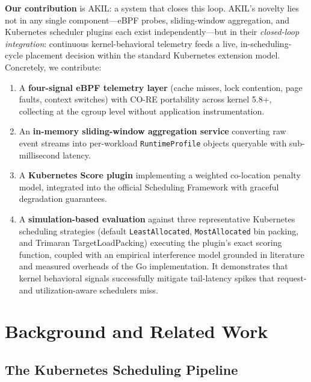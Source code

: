\documentclass[10pt,conference,a4paper]{IEEEtran}
\newcommand{\akil}{\textsc{AKIL}\xspace}
\newcommand{\sys}{\akil}
\begin{document}
\textbf{Our contribution} is \sys: a system that closes this loop.
AKIL's novelty lies not in any single component---eBPF probes, sliding-window
aggregation, and Kubernetes scheduler plugins each exist independently---but in their
\emph{closed-loop integration}: continuous kernel-behavioral telemetry feeds a live,
in-scheduling-cycle placement decision within the standard Kubernetes extension model.
Concretely, we contribute:

\begin{enumerate}[leftmargin=*,topsep=2pt,itemsep=1pt]
  \item A \textbf{four-signal eBPF telemetry layer} (cache misses, lock contention,
        page faults, context switches) with CO-RE portability across kernel 5.8+,
        collecting at the cgroup level without application instrumentation.
  \item An \textbf{in-memory sliding-window aggregation service} converting raw event
        streams into per-workload \texttt{RuntimeProfile} objects queryable with
        sub-millisecond latency.
  \item A \textbf{Kubernetes Score plugin} implementing a weighted co-location penalty
        model, integrated into the official Scheduling Framework with graceful
        degradation guarantees.
  \item A \textbf{simulation-based evaluation} against three representative Kubernetes
        scheduling strategies (default \texttt{LeastAllocated}, \texttt{MostAllocated}
        bin packing, and Trimaran TargetLoadPacking) executing the plugin's exact scoring
        function, coupled with an empirical interference model grounded in literature and
        measured overheads of the Go implementation. It demonstrates that kernel behavioral
        signals successfully mitigate tail-latency spikes that request- and utilization-aware
        schedulers miss.
\end{enumerate}

\section{Background and Related Work}
\label{sec:background}

\subsection{The Kubernetes Scheduling Pipeline}
\end{document}
